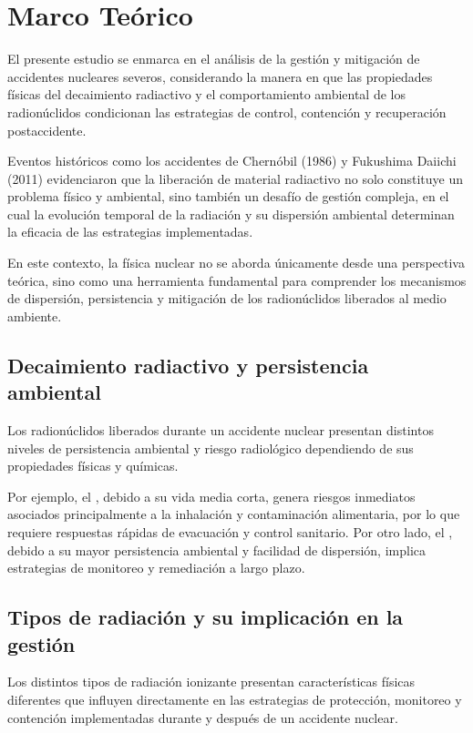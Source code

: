 \section{Marco Teórico}

El presente estudio se enmarca en el análisis de la gestión y mitigación de accidentes nucleares severos, considerando la manera en que las propiedades físicas del decaimiento radiactivo y el comportamiento ambiental de los radionúclidos condicionan las estrategias de control, contención y recuperación postaccidente.

Eventos históricos como los accidentes de Chernóbil (1986) y Fukushima Daiichi (2011) evidenciaron que la liberación de material radiactivo no solo constituye un problema físico y ambiental, sino también un desafío de gestión compleja, en el cual la evolución temporal de la radiación y su dispersión ambiental determinan la eficacia de las estrategias implementadas.

En este contexto, la física nuclear no se aborda únicamente desde una perspectiva teórica, sino como una herramienta fundamental para comprender los mecanismos de dispersión, persistencia y mitigación de los radionúclidos liberados al medio ambiente.

\subsection{Decaimiento radiactivo y persistencia ambiental}

Los radionúclidos liberados durante un accidente nuclear presentan distintos niveles de persistencia ambiental y riesgo radiológico dependiendo de sus propiedades físicas y químicas.

Por ejemplo, el , debido a su vida media corta, genera riesgos inmediatos asociados principalmente a la inhalación y contaminación alimentaria, por lo que requiere respuestas rápidas de evacuación y control sanitario. Por otro lado, el , debido a su mayor persistencia ambiental y facilidad de dispersión, implica estrategias de monitoreo y remediación a largo plazo.

\subsection{Tipos de radiación y su implicación en la gestión}

Los distintos tipos de radiación ionizante presentan características físicas diferentes que influyen directamente en las estrategias de protección, monitoreo y contención implementadas durante y después de un accidente nuclear.

